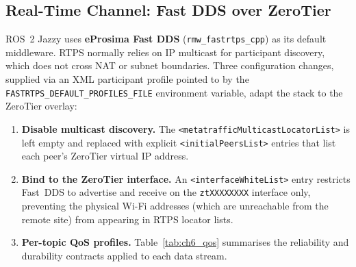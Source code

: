 \subsection{Real-Time Channel: Fast DDS over ZeroTier}
\label{subsec:ch6_fastdds}

ROS~2 Jazzy uses \textbf{eProsima Fast DDS} (\texttt{rmw\_fastrtps\_cpp}) as its default
middleware.  RTPS normally relies on IP multicast for participant discovery, which does not
cross NAT or subnet boundaries.  Three configuration changes, supplied via an XML participant
profile pointed to by the \texttt{FASTRTPS\_DEFAULT\_PROFILES\_FILE} environment variable,
adapt the stack to the ZeroTier overlay:

\begin{enumerate}
    \item \textbf{Disable multicast discovery.}  The \texttt{<metatrafficMulticastLocatorList>}
          is left empty and replaced with explicit \texttt{<initialPeersList>} entries that list
          each peer's ZeroTier virtual IP address.

    \item \textbf{Bind to the ZeroTier interface.}  An \texttt{<interfaceWhiteList>} entry
          restricts Fast~DDS to advertise and receive on the \texttt{ztXXXXXXXX} interface only,
          preventing the physical Wi-Fi addresses (which are unreachable from the remote site)
          from appearing in RTPS locator lists.

    \item \textbf{Per-topic QoS profiles.}  Table~\ref{tab:ch6_qos} summarises the reliability
          and durability contracts applied to each data stream.
\end{enumerate}

